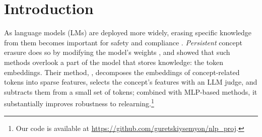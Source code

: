 \section{Introduction}
\label{sec:intro}

As language models (LMs) are deployed more widely, erasing specific knowledge from them becomes important for safety and compliance \citep{eldan2023harry,li2024wmdp}.
\emph{Persistent} concept erasure does so by modifying the model's weights \citep{gurarieh2025precise,ashuach2026crisp}, and \citet{suslik2026ember} showed that such methods overlook a part of the model that stores knowledge: the token embeddings.
Their method, \ember{}, decomposes the embeddings of concept-related tokens into sparse features, selects the concept's features with an LLM judge, and subtracts them from a small set of tokens; combined with MLP-based methods, it substantially improves robustness to relearning.\footnote{Our code is available at \url{https://github.com/guretskiysemyon/nlp_proj}.}

